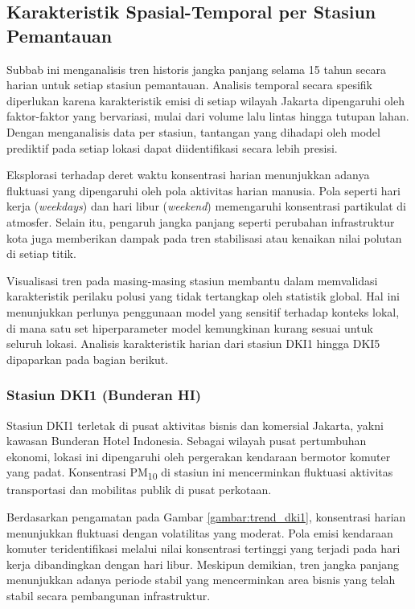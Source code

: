 \subsection{Karakteristik Spasial-Temporal per Stasiun Pemantauan}

Subbab ini menganalisis tren historis jangka panjang selama 15 tahun secara harian untuk setiap stasiun pemantauan. Analisis temporal secara spesifik diperlukan karena karakteristik emisi di setiap wilayah Jakarta dipengaruhi oleh faktor-faktor yang bervariasi, mulai dari volume lalu lintas hingga tutupan lahan. Dengan menganalisis data per stasiun, tantangan yang dihadapi oleh model prediktif pada setiap lokasi dapat diidentifikasi secara lebih presisi.

Eksplorasi terhadap deret waktu konsentrasi harian menunjukkan adanya fluktuasi yang dipengaruhi oleh pola aktivitas harian manusia. Pola seperti hari kerja (\textit{weekdays}) dan hari libur (\textit{weekend}) memengaruhi konsentrasi partikulat di atmosfer. Selain itu, pengaruh jangka panjang seperti perubahan infrastruktur kota juga memberikan dampak pada tren stabilisasi atau kenaikan nilai polutan di setiap titik.

Visualisasi tren pada masing-masing stasiun membantu dalam memvalidasi karakteristik perilaku polusi yang tidak tertangkap oleh statistik global. Hal ini menunjukkan perlunya penggunaan model yang sensitif terhadap konteks lokal, di mana satu set hiperparameter model kemungkinan kurang sesuai untuk seluruh lokasi. Analisis karakteristik harian dari stasiun DKI1 hingga DKI5 dipaparkan pada bagian berikut.

\newpage

\subsubsection{Stasiun DKI1 (Bunderan HI)}

Stasiun DKI1 terletak di pusat aktivitas bisnis dan komersial Jakarta, yakni kawasan Bunderan Hotel Indonesia. Sebagai wilayah pusat pertumbuhan ekonomi, lokasi ini dipengaruhi oleh pergerakan kendaraan bermotor komuter yang padat. Konsentrasi PM\textsubscript{10} di stasiun ini mencerminkan fluktuasi aktivitas transportasi dan mobilitas publik di pusat perkotaan.

Berdasarkan pengamatan pada Gambar \ref{gambar:trend_dki1}, konsentrasi harian menunjukkan fluktuasi dengan volatilitas yang moderat. Pola emisi kendaraan komuter teridentifikasi melalui nilai konsentrasi tertinggi yang terjadi pada hari kerja dibandingkan dengan hari libur. Meskipun demikian, tren jangka panjang menunjukkan adanya periode stabil yang mencerminkan area bisnis yang telah stabil secara pembangunan infrastruktur.


